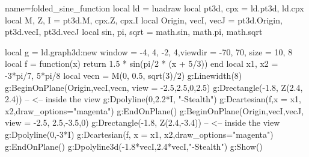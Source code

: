 \documentclass{standalone}
\begin{document}
\begin{luadraw}{name=folded_sine_function}
    local ld = luadraw
    local pt3d, cpx = ld.pt3d, ld.cpx
    local M, Z, I = pt3d.M, cpx.Z, cpx.I
    local Origin, vecI, vecJ = pt3d.Origin, pt3d.vecI, pt3d.vecJ
    local sin, pi, sqrt = math.sin, math.pi, math.sqrt

    local g = ld.graph3d:new{ window = {-4, 4, -2, 4},viewdir = {-70, 70}, size = {10, 8} }
    local f = function(x) 
        return 1.5 * sin(pi/2 * (x + 5/3))
    end
    local x1, x2 = -3*pi/7, 5*pi/8
    local vecn = M(0, 0.5, sqrt(3)/2)
    g:Linewidth(8)
    g:BeginOnPlane({Origin,vecI,vecn}, {view = {-2.5,2.5,0,2.5}})
        g:Drectangle(-1.8, Z(2.4, 2.4)) -- <-- inside the view
        g:Dpolyline({{0,2.2*I}}, "-Stealth")
        g:Dcartesian(f,{x = {x1, x2},draw_options="magenta"})
    g:EndOnPlane()
    g:BeginOnPlane({Origin,vecI,vecJ}, {view = {-2.5, 2.5,-3.5,0}})
        g:Drectangle(-1.8, Z(2.4,-3.4)) -- <-- inside the view
        g:Dpolyline({0,-3*I})
        g:Dcartesian(f, {x = {x1, x2},draw_options="magenta"})
    g:EndOnPlane()
    g:Dpolyline3d({-1.8*vecI,2.4*vecI},"-Stealth")
    g:Show()
\end{luadraw}
\end{document}
